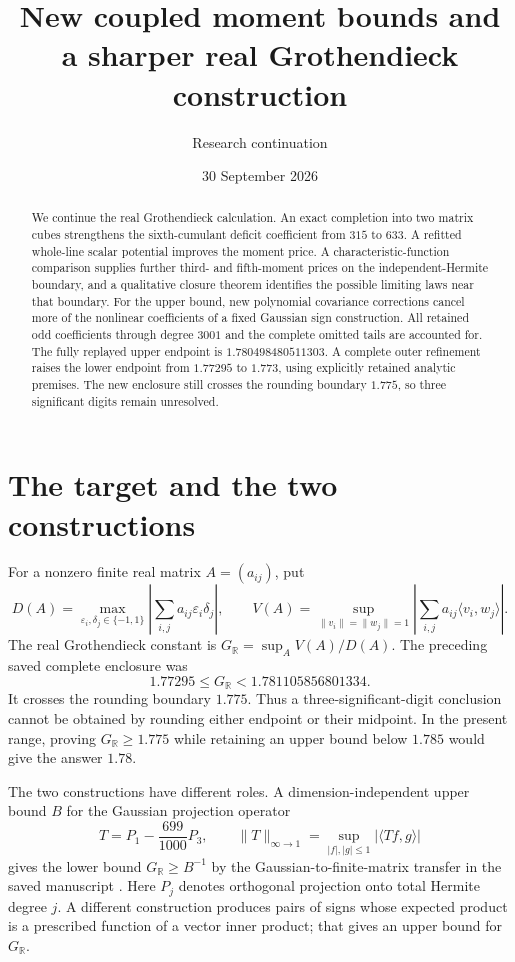 \documentclass[11pt]{article}
\title{New coupled moment bounds and a sharper real Grothendieck construction}
\author{Research continuation}
\date{30 September 2026}
\newcommand{\R}{\mathbb R}
\newcommand{\GR}{G_{\R}}
\newcommand{\ip}[2]{\langle #1,#2\rangle}
\newcommand{\norm}[1]{\lVert #1\rVert}
\begin{document}
\setlength{\abovedisplayskip}{8pt}
\setlength{\belowdisplayskip}{8pt}
\setlength{\abovedisplayshortskip}{4pt}
\setlength{\belowdisplayshortskip}{6pt}
\maketitle
\begin{abstract}
We continue the real Grothendieck calculation. An exact completion into two matrix cubes strengthens the sixth-cumulant deficit coefficient from $315$ to $633$. A refitted whole-line scalar potential improves the moment price. A characteristic-function comparison supplies further third- and fifth-moment prices on the independent-Hermite boundary, and a qualitative closure theorem identifies the possible limiting laws near that boundary. For the upper bound, new polynomial covariance corrections cancel more of the nonlinear coefficients of a fixed Gaussian sign construction. All retained odd coefficients through degree $3001$ and the complete omitted tails are accounted for. The fully replayed upper endpoint is $1.780498480511303$. A complete outer refinement raises the lower endpoint from $1.77295$ to $1.773$, using explicitly retained analytic premises. The new enclosure still crosses the rounding boundary $1.775$, so three significant digits remain unresolved.
\end{abstract}

\section{The target and the two constructions}
For a nonzero finite real matrix $A=(a_{ij})$, put
\begin{equation}
 D(A)=\max_{\varepsilon_i,\delta_j\in\{-1,1\}}
 \left|\sum_{i,j}a_{ij}\varepsilon_i\delta_j\right|,
 \qquad
 V(A)=\sup_{\norm{v_i}=\norm{w_j}=1}
 \left|\sum_{i,j}a_{ij}\ip{v_i}{w_j}\right|.
\end{equation}
The real Grothendieck constant is $\GR=\sup_A V(A)/D(A)$.
The preceding saved complete enclosure was
\begin{equation}\label{eq:inherited}
 1.77295\le\GR<1.781105856801334.
\end{equation}
It crosses the rounding boundary $1.775$. Thus a three-significant-digit conclusion cannot be obtained by rounding either endpoint or their midpoint. In the present range, proving $\GR\ge1.775$ while retaining an upper bound below $1.785$ would give the answer $1.78$.

The two constructions have different roles. A dimension-independent upper bound $B$ for the Gaussian projection operator
\begin{equation}\label{eq:cubic-operator}
 T=P_1-\frac{699}{1000}P_3,
 \qquad
 \norm{T}_{\infty\to1}
 =\sup_{|f|,|g|\le1}|\ip{Tf}{g}|
\end{equation}
gives the lower bound $\GR\ge B^{-1}$ by the Gaussian-to-finite-matrix transfer in the saved manuscript \cite{saved}. Here $P_j$ denotes orthogonal projection onto total Hermite degree $j$. A different construction produces pairs of signs whose expected product is a prescribed function of a vector inner product; that gives an upper bound for $\GR$.
\end{document}
